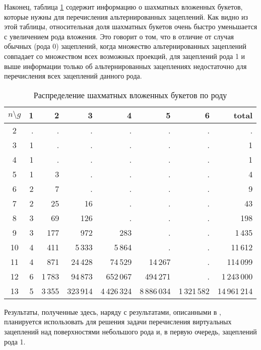 \documentclass[a4paper,12pt]{article}
\theoremstyle{plain}
\theoremstyle{definition}
\begin{document}
Наконец, таблица \ref{table:cheq} содержит информацию о шахматных вложенных букетов, которые нужны для перечисления
альтернированных зацеплений. Как видно из этой таблицы, относительная доля шахматных букетов очень быстро уменьшается с
увеличением рода вложения. Это говорит о том, что в отличие от случая обычных (рода 0) зацеплений, когда множество
альтернированных зацеплений совпадает со множеством всех возможных проекций, для зацеплений рода 1 и выше информации только об
альтернированных зацеплениях недостаточно для перечисления всех зацеплений данного рода.
\begin{table}[!t]\footnotesize
\caption{\small Распределение шахматных вложенных букетов по роду\label{table:cheq}} \centering
\begin{tabular}{|c||r|r|r|r|r|r||r|}
\hline
$n \setminus g$ &  1 &  2 &  3 &  4 &  5  & 6  & total\\\hline\hline
2  & . &    . &      . &       . &       . &       . &        . \\
3  & 1 &    . &      . &       . &       . &       . &        1 \\
4  & 1 &    . &      . &       . &       . &       . &        1 \\
5  & 1 &    3 &      . &       . &       . &       . &        4 \\
6  & 2 &    7 &      . &       . &       . &       . &        9 \\
7  & 2 &   25 &     16 &       . &       . &       . &       43 \\
8  & 3 &   69 &    126 &       . &       . &       . &      198 \\
9  & 3 &  177 &    972 &     283 &       . &       . &     1\,435 \\
10 & 4 &  411 &   5\,333 &    5\,864 &       . &       . &    11\,612 \\
11 & 4 &  871 &  24\,428 &   74\,529 &   14\,267 &       . &   114\,099 \\
12 & 6 & 1\,783 &  94\,873 &  652\,067 &  494\,271 &       . &  1\,243\,000 \\
13 & 5 & 3\,355 & 323\,914 & 4\,426\,324 & 8\,886\,034 & 1\,321\,582 & 14\,961\,214 \\
\hline
\end{tabular}
\end{table}

Результаты, полученные здесь, наряду с результатами, описанными в \cite{We_Tangles2010}, планируется использовать для решения
задачи перечисления виртуальных зацеплений над поверхностями небольшого рода и, в первую очередь, зацеплений рода 1.
\end{document}
